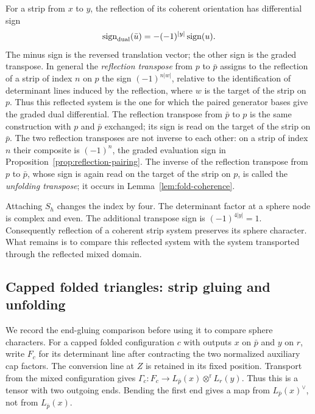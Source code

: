 \documentclass[11pt]{amsart}
\theoremstyle{definition}
\theoremstyle{remark}
\theoremstyle{plain}
\numberwithin{equation}{section}
\begin{document}
For a strip from $x$ to $y$, the
reflection of its coherent orientation
has differential sign
\begin{equation}\label{eq:reflection-sign}
 \operatorname{sign}_{\rm dual}(\bar u)
   =-(-1)^{|y|}\operatorname{sign}(u).
\end{equation}
The minus sign is the reversed
translation vector; the other sign is
the graded transpose. In general the
\emph{reflection transpose} from $p$ to
$\bar p$ assigns to the reflection of a
strip of index $n$ on $p$ the sign
$(-1)^{n|w|}$, relative to the
identification of determinant lines
induced by the reflection, where $w$ is
the target of the strip on $p$. Thus this
reflected system is the one for which the
paired generator bases give the graded
dual differential. The reflection
transpose from $\bar p$ to $p$ is the same
construction with $p$ and $\bar p$
exchanged; its sign is read on the target
of the strip on $\bar p$. The two
reflection transposes are not inverse to
each other: on a strip of index $n$ their
composite is $(-1)^n$, the graded
evaluation sign in
Proposition~\ref{prop:reflection-pairing}.
The inverse of the reflection transpose
from $p$ to $\bar p$, whose sign is again
read on the target of the strip on $p$, is
called the \emph{unfolding transpose}; it
occurs in Lemma~\ref{lem:fold-coherence}.

Attaching $S_h$ changes the index by four.
The determinant factor at a sphere node
is complex and even. The additional
transpose sign is $(-1)^{4|y|}=1$.
Consequently reflection of a coherent
strip system preserves its sphere
character. What remains is to compare
this reflected system with the system
transported through the reflected mixed
domain.

\subsection{Capped folded triangles: strip gluing and unfolding}
We record the end-gluing comparison before using it to compare
sphere characters. For a capped folded configuration $c$ with
outputs $x$ on $\bar p$ and $y$ on $r$, write $F_c$ for its
determinant line after contracting the two normalized auxiliary
cap factors. The conversion line at $Z$ is retained in its fixed
position. Transport from the mixed configuration gives
$\Gamma_c:F_c\to L_{\bar p}(x)\otimes^{\mathrm r} L_r(y)$.
Thus this is a tensor with two outgoing ends. Bending the first
end gives a map from $L_{\bar p}(x)^\vee$, not from
$L_{\bar p}(x)$.
\end{document}

